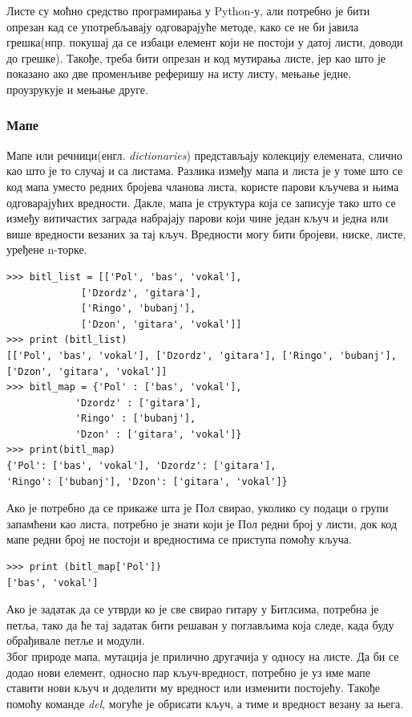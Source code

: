 \documentclass[11pt, serbianc, english, titlepage]{article}
\begin{document}
		Листе су моћно средство програмирања у Python-у, али потребно је бити опрезан кад се употребљавају одговарајуће методе, како се не би јавила грешка(нпр. покушај да се избаци елемент који не постоји у датој листи, доводи до грешке). Такође, треба бити опрезан и код мутирања листе, јер као што је показано ако две променљиве реферишу на исту листу, мењање једне, проузрукује и мењање друге. 
		\subsubsection{Мапе}\label{subsec:maps}
		Мапе или речници(енгл. \emph{dictionaries}) представљају колекцију елемената, слично као што је то случај и са листама. Разлика између мапа и листа је у томе што се код мапа уместо редних бројева чланова листа, користе парови кључева и њима одговарајућих вредности. Дакле, мапа је структура која се записује тако што се између витичастих заграда набрајају парови који чине један кључ и једна или више вредности везаних за тај кључ. Вредности могу бити бројеви, ниске, листе, уређене n-торке. 
		\begin{lstlisting}[caption = Разлика између листе и мапе, label = map_vs_list]
>>> bitl_list = [['Pol', 'bas', 'vokal'],
	         ['Dzordz', 'gitara'],
	         ['Ringo', 'bubanj'],
	         ['Dzon', 'gitara', 'vokal']]
>>> print (bitl_list)
[['Pol', 'bas', 'vokal'], ['Dzordz', 'gitara'], ['Ringo', 'bubanj'], 
['Dzon', 'gitara', 'vokal']]
>>> bitl_map = {'Pol' : ['bas', 'vokal'],
	        'Dzordz' : ['gitara'],
	        'Ringo' : ['bubanj'],
	        'Dzon' : ['gitara', 'vokal']}
>>> print(bitl_map)
{'Pol': ['bas', 'vokal'], 'Dzordz': ['gitara'], 
'Ringo': ['bubanj'], 'Dzon': ['gitara', 'vokal']}
		\end{lstlisting}
		Ако је потребно да се прикаже шта је Пол свирао, уколико су подаци о групи запамћени као листа, потребно је знати који је Пол редни број у листи, док код мапе редни број не постоји и вредностима се приступа помоћу кључа.
		\begin{lstlisting}[caption = Кључ и вредност, label = key_value]
>>> print (bitl_map['Pol'])
['bas', 'vokal']
		\end{lstlisting}
		Ако је задатак да се утврди ко је све свирао гитару у Битлсима, потребна је петља, тако да ће тај задатак бити решаван у поглављима која следе, када буду обрађивале петље и модули.\\
		Због природе мапа, мутација је прилично другачија у односу на листе. Да би се додао нови елемент, односно пар кључ-вредност, потребно је уз име мапе ставити нови кључ и доделити му вредност или изменити постојећу. Такође помоћу команде \emph{del}, могуће је обрисати кључ, а тиме и вредност везану за њега.
\end{document}
